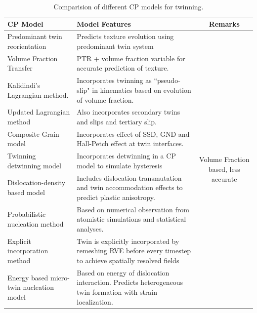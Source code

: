 \begin{table}[H]
  \centering
  \caption{Comparision of different CP models for twinning.}
  \renewcommand\arraystretch{1.2}
  \renewcommand\baselinestretch{1.2}
  \begin{tabular}{|m{4.2cm}|m{7.8cm}|c|}
    \hline
    CP Model & Model Features & Remarks \\
    \hline
    Predominant twin reorientation \cite{HOUTTE1978591} & Predicts texture evolution using predominant twin system & \multicolumn{1}{|c|}{\multirow{15}{2cm}{Volume Fraction based, less accurate}} \\
    \cline{1-2}
    Volume Fraction Transfer \cite{TOME19912667} & PTR + volume fraction variable for accurate prediction of texture. & \multicolumn{1}{|c|}{} \\
    \cline{1-2}
    Kalidindi's Lagrangian method.\cite{KALIDINDI1998267} & Incorporates twinning as ``pseudo-slip" in kinematics based on evolution of volume fraction. & \multicolumn{1}{|c|}{} \\
    \cline{1-2}
    Updated Lagrangian method \cite{LEVESQUE201065} \cite{Lebensohn.2003.1212} & Also incorporates secondary twins and slips and tertiary slip. & \multicolumn{1}{|c|}{} \\
    \cline{1-2}
    Composite Grain model \cite{PROUST20072137} \cite{PROUST2009861} & Incorporates effect of SSD, GND and Hall-Petch effect at twin interfaces. & \multicolumn{1}{|c|}{} \\
    \cline{1-2}
    Twinning detwinning model \cite{WANG201293} \cite{WANG201336} & Incorporates detwinning in a CP model to simulate hysteresis & \multicolumn{1}{|c|}{} \\
    \cline{1-2}
    Dislocation-density based model \cite{BEYERLEIN2008867} \cite{Knezevic201555} & Includes dislocation transmutation and twin accommodation effects to predict plastic anisotropy. & \multicolumn{1}{|c|}{} \\
    \cline{1-2}
    Probabilistic nucleation method \cite{beyerlein2010probabilistic} \cite{BARNETT2015151} & Based on numerical observation from atomistic simulations and statistical analyses. & \multicolumn{1}{|c|}{} \\
    \cline{1-2}
    Explicit incorporation method \cite{ABDOLVAND2013783} \cite{ARDELJAN2015396} & Twin is explicitly incorporated by remeshing RVE before every timestep to achieve spatially resolved fields & \multicolumn{1}{|c|}{} \\
    \hline
    Energy based micro-twin nucleation model \cite{CHENG2015148} \cite{PARAMATMUNI2020102778} & Based on energy of dislocation interaction. Predicts heterogeneous twin formation with strain localization. & \multicolumn{1}{|c|}{\multirow{3}{2cm}{Energy based approaches, Computationally expensive}} \\

\end{tabular}
\end{table}
